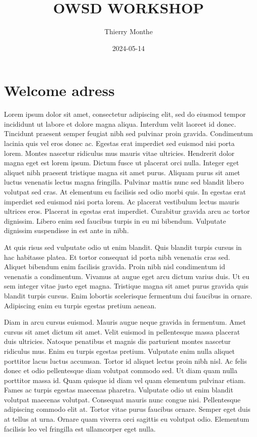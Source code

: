 \documentclass[
]{book}
\title{OWSD WORKSHOP}
\author{Thierry Monthe}
\date{2024-05-14}
\begin{document}
\maketitle

{
\setcounter{tocdepth}{1}
\tableofcontents
}
\hypertarget{welcome-adress}{%
\chapter{Welcome adress}\label{welcome-adress}}

Lorem ipsum dolor sit amet, consectetur adipiscing elit, sed do eiusmod tempor incididunt ut labore et dolore magna aliqua. Interdum velit laoreet id donec. Tincidunt praesent semper feugiat nibh sed pulvinar proin gravida. Condimentum lacinia quis vel eros donec ac. Egestas erat imperdiet sed euismod nisi porta lorem. Montes nascetur ridiculus mus mauris vitae ultricies. Hendrerit dolor magna eget est lorem ipsum. Dictum fusce ut placerat orci nulla. Integer eget aliquet nibh praesent tristique magna sit amet purus. Aliquam purus sit amet luctus venenatis lectus magna fringilla. Pulvinar mattis nunc sed blandit libero volutpat sed cras. At elementum eu facilisis sed odio morbi quis. In egestas erat imperdiet sed euismod nisi porta lorem. Ac placerat vestibulum lectus mauris ultrices eros. Placerat in egestas erat imperdiet. Curabitur gravida arcu ac tortor dignissim. Libero enim sed faucibus turpis in eu mi bibendum. Vulputate dignissim suspendisse in est ante in nibh.

At quis risus sed vulputate odio ut enim blandit. Quis blandit turpis cursus in hac habitasse platea. Et tortor consequat id porta nibh venenatis cras sed. Aliquet bibendum enim facilisis gravida. Proin nibh nisl condimentum id venenatis a condimentum. Vivamus at augue eget arcu dictum varius duis. Ut eu sem integer vitae justo eget magna. Tristique magna sit amet purus gravida quis blandit turpis cursus. Enim lobortis scelerisque fermentum dui faucibus in ornare. Adipiscing enim eu turpis egestas pretium aenean.

Diam in arcu cursus euismod. Mauris augue neque gravida in fermentum. Amet cursus sit amet dictum sit amet. Velit euismod in pellentesque massa placerat duis ultricies. Natoque penatibus et magnis dis parturient montes nascetur ridiculus mus. Enim eu turpis egestas pretium. Vulputate enim nulla aliquet porttitor lacus luctus accumsan. Tortor id aliquet lectus proin nibh nisl. Ac felis donec et odio pellentesque diam volutpat commodo sed. Ut diam quam nulla porttitor massa id. Quam quisque id diam vel quam elementum pulvinar etiam. Fames ac turpis egestas maecenas pharetra. Vulputate odio ut enim blandit volutpat maecenas volutpat. Consequat mauris nunc congue nisi. Pellentesque adipiscing commodo elit at. Tortor vitae purus faucibus ornare. Semper eget duis at tellus at urna. Ornare quam viverra orci sagittis eu volutpat odio. Elementum facilisis leo vel fringilla est ullamcorper eget nulla.
\end{document}
